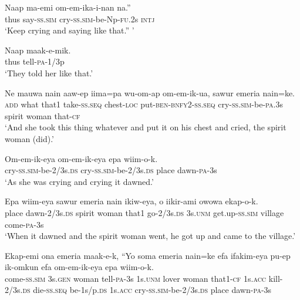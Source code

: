 \ea
\gll  Naap  ma-emi  om-em-ika-i-nan  na.” \\
thus  say-\textsc{ss}.\textsc{sim}  cry-\textsc{ss}.\textsc{sim}-be-Np-\textsc{fu}.2s  \textsc{intj} \\
\glt ‘Keep crying and saying like that.” ’ \\
\z


\ea
\gll  Naap  maak-e-mik. \\
thus  tell-\textsc{pa}-1/3p \\
\glt ‘They told her like that.’ \\
\z


\ea
\gll  Ne  mauwa  nain  aaw-ep  iima=pa  wu-om-ap                 om-em-ik-ua,  sawur  emeria  nain=ke. \\
\textsc{add}  what  that1  take-\textsc{ss.seq}  chest-\textsc{loc}  put-\textsc{ben}-\textsc{bnfy}2-\textsc{ss.seq}   cry-\textsc{ss}.\textsc{sim}-be-\textsc{pa}.3s  spirit  woman  that-\textsc{cf} \\


\glt ‘And she took this thing whatever and put it on his chest and cried, the spirit woman (did).’ \\
\z


\ea
\gll  Om-em-ik-eya  om-em-ik-eya  epa  wiim-o-k. \\
cry-\textsc{ss}.\textsc{sim}-be-2/3s.\textsc{ds}  cry-\textsc{ss}.\textsc{sim}-be-2/3s.\textsc{ds}  place  dawn-\textsc{pa}-3s \\
\glt ‘As she was crying and crying it dawned.’ \\
\z


\ea
\gll  Epa  wiim-eya  sawur  emeria  nain  ikiw-eya,  o  iikir-ami             owowa  ekap-o-k. \\
place  dawn-2/3s.\textsc{ds}  spirit  woman  that1  go-2/3s.\textsc{ds}  3s.\textsc{unm}  get.up-\textsc{ss}.\textsc{sim}  village  come-\textsc{pa}-3s \\


\glt ‘When it dawned and the spirit woman went, he got up and came to the village.’ \\
\z


\ea
\gll  Ekap-emi  ona  emeria  maak-e-k,  “Yo  soma  emeria  nain=ke  efa          ifakim-eya  pu-ep  ik-omkun  efa  om-em-ik-eya                       epa  wiim-o-k. \\
come-\textsc{ss}.\textsc{sim}  3s.\textsc{gen}  woman  tell-\textsc{pa}-3s  1s.\textsc{unm}  lover  woman  that1-\textsc{cf}  1s.\textsc{acc}   kill-2/3s.\textsc{ds}  die-\textsc{ss.seq}  be-1s/p.\textsc{ds}  1s.\textsc{acc}  cry-\textsc{ss}.\textsc{sim}-be-2/3s.\textsc{ds}  place  dawn-\textsc{pa}-3s \\




